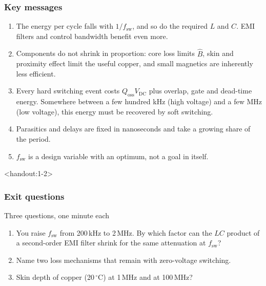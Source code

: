 \begin{frame}
	\frametitle{Key messages}
	\begin{enumerate}
		\item The energy per cycle falls with $1/f_\mathrm{sw}$, and so do the required $L$ and $C$. EMI filters and control bandwidth benefit even more.
		\item Components do not shrink in proportion: core loss limits $\hat{B}$, skin and proximity effect limit the useful copper, and small magnetics are inherently less efficient.
		\item Every hard switching event costs $Q_\mathrm{oss}V_\mathrm{DC}$ plus overlap, gate and dead-time energy. Somewhere between a few hundred kHz (high voltage) and a few MHz (low voltage), this energy must be recovered by soft switching.
		\item Parasitics and delays are fixed in nanoseconds and take a growing share of the period.
		\item $f_\mathrm{sw}$ is a design variable with an optimum, not a goal in itself.
	\end{enumerate}
\end{frame}

\begin{frame}<handout:1-2>
	\frametitle{Exit questions}
	\begin{varblock}[\textwidth]{Three questions, one minute each}
		\begin{enumerate}
			\item You raise $f_\mathrm{sw}$ from 200\,kHz to 2\,MHz. By which factor can the $LC$ product of a second-order EMI filter shrink for the same attenuation at $f_\mathrm{sw}$?
			\item Name two loss mechanisms that remain with zero-voltage switching.
			\item Skin depth of copper (20\,$^\circ$C) at 1\,MHz and at 100\,MHz?
		\end{enumerate}
	\end{varblock}
\end{frame}

